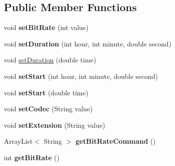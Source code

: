\subsection*{Public Member Functions}
\begin{DoxyCompactItemize}
\item 
\hypertarget{classvideo_1_1_profile_af9d70daf499e7d885ca543985f970cee}{
void {\bfseries setBitRate} (int value)}
\label{classvideo_1_1_profile_af9d70daf499e7d885ca543985f970cee}

\item 
\hypertarget{classvideo_1_1_profile_a05e545e89665f73c6b52ed0b5809e925}{
void {\bfseries setDuration} (int hour, int minute, double second)}
\label{classvideo_1_1_profile_a05e545e89665f73c6b52ed0b5809e925}

\item 
void \hyperlink{classvideo_1_1_profile_a2272c75453c3b9d64ff63a43ed1f1e84}{setDuration} (double time)
\item 
\hypertarget{classvideo_1_1_profile_a15f5377f9cb3d92e6c7dd033f37f0539}{
void {\bfseries setStart} (int hour, int minute, double second)}
\label{classvideo_1_1_profile_a15f5377f9cb3d92e6c7dd033f37f0539}

\item 
\hypertarget{classvideo_1_1_profile_a3d97ab049cee8491c4bcbab544de3f22}{
void {\bfseries setStart} (double time)}
\label{classvideo_1_1_profile_a3d97ab049cee8491c4bcbab544de3f22}

\item 
\hypertarget{classvideo_1_1_profile_a7437ae87933a7b856d068de0ba30620d}{
void {\bfseries setCodec} (String value)}
\label{classvideo_1_1_profile_a7437ae87933a7b856d068de0ba30620d}

\item 
\hypertarget{classvideo_1_1_profile_a30daf3b33a26f8f6cc177fb5fde01356}{
void {\bfseries setExtension} (String value)}
\label{classvideo_1_1_profile_a30daf3b33a26f8f6cc177fb5fde01356}

\item 
\hypertarget{classvideo_1_1_profile_aa356b9144652c16e8702233b961fcfb0}{
ArrayList$<$ String $>$ {\bfseries getBitRateCommand} ()}
\label{classvideo_1_1_profile_aa356b9144652c16e8702233b961fcfb0}

\item 
\hypertarget{classvideo_1_1_profile_a20b6dcc639aa1e3fca372625ffd19643}{
int {\bfseries getBitRate} ()}
\label{classvideo_1_1_profile_a20b6dcc639aa1e3fca372625ffd19643}


\end{DoxyCompactItemize}
